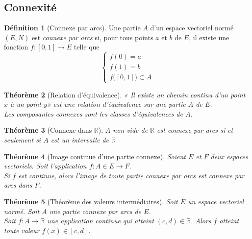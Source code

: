 \documentclass[11pt,a4paper]{report}
\newtheorem{theorem}{Théorème}[chapter]
\newtheorem{itheorem}[theorem]{Théorème}
\theoremstyle{definition}
\newtheorem{dfn}[theorem]{Définition}
\begin{document}
\subsection{Connexité}
\begin{dfn}[Connexe par arcs]
    Une partie $A$ d'un espace vectoriel normé $(E,N)$  est \emph{connexe par arcs} \linebreak si, pour tous points $a$ et $b$ de $E$, il existe une fonction $f:[0,1] \to E$  telle que 
    \begin{equation}
    \left\lbrace
    \begin{gathered}
    f(0)=a \\
    f(1)=b \\
    f\big( [0,1] \big) \subset A
    \end{gathered}
    \right.
    \end{equation}
\end{dfn}
\begin{theorem}[Relation d'équivalence]
     «{} Il existe un chemin continu d'un point $x$ à un point $y$»{} %
     est une relation d'équivalence sur une partie $A$ de $E$.\\
     Les \emph{composantes connexes} sont les classes d'équivalences de $A$.
\end{theorem}
\begin{theorem}[Connexe dans \ensuremath{\mathbb{R}}]
    $A$ non vide de $\ensuremath{\mathbb{R}}$ est connexe par arcs \emph{si et seulement si} $A$ est un intervalle de $\ensuremath{\mathbb{R}}$
\end{theorem}
\begin{theorem}[Image continue d'une partie connexe]
     Soient $E$ et $F$ deux espaces vectoriels. Soit l'application $f : A\in E \to F$.\\
     Si $f$ est continue, alors l'image de toute partie connexe par arcs est connexe par arcs dans $F$.
\end{theorem}
\begin{itheorem}[Théorème des valeurs intermédiaires]
     Soit $E$ un espace vectoriel normé. Soit $A$ une partie connexe par arcs de $E$. \\
     Soit $f : A \to \ensuremath{\mathbb{R}}$ une application continue qui atteint $(c,d)\in \ensuremath{\mathbb{R}}$. Alors $f$ atteint toute valeur $f(x) \in [c,d]$.
\end{itheorem}
\end{document}
